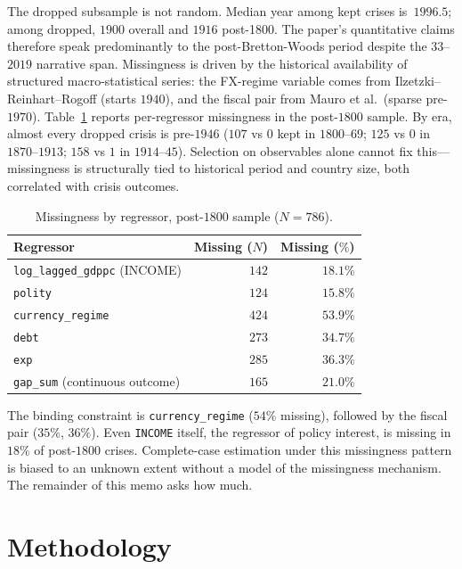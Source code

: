 \documentclass[11pt]{article}
\begin{document}
The dropped subsample is not random. Median year among kept crises
is~$1996.5$; among dropped, $1900$ overall and $1916$ post-1800. The
paper's quantitative claims therefore speak predominantly to the
post-Bretton-Woods period despite the $33$--$2019$ narrative span.
Missingness is driven by the historical availability of structured
macro-statistical series: the FX-regime variable comes from
Ilzetzki--Reinhart--Rogoff (starts $1940$), and the fiscal pair from
Mauro et al.\ (sparse pre-$1970$). Table~\ref{tab:miss} reports
per-regressor missingness in the post-$1800$ sample. By era, almost
every dropped crisis is pre-$1946$ ($107$ vs $0$ kept in $1800$--$69$;
$125$ vs $0$ in $1870$--$1913$; $158$ vs $1$ in $1914$--$45$).
Selection on observables alone cannot fix this---missingness is
structurally tied to historical period and country size, both
correlated with crisis outcomes.

\begin{table}[h]
\centering
\caption{Missingness by regressor, post-$1800$ sample ($N = 786$).}
\label{tab:miss}
\begin{tabular}{lrr}
\toprule
Regressor & Missing ($N$) & Missing ($\%$) \\
\midrule
\texttt{log\_lagged\_gdppc} (INCOME) & $142$ & $18.1\%$ \\
\texttt{polity}                       & $124$ & $15.8\%$ \\
\texttt{currency\_regime}             & $424$ & $53.9\%$ \\
\texttt{debt}                         & $273$ & $34.7\%$ \\
\texttt{exp}                          & $285$ & $36.3\%$ \\
\texttt{gap\_sum} (continuous outcome) & $165$ & $21.0\%$ \\
\bottomrule
\end{tabular}
\end{table}

The binding constraint is \texttt{currency\_regime} ($54\%$ missing),
followed by the fiscal pair ($35\%$, $36\%$). Even \texttt{INCOME}
itself, the regressor of policy interest, is missing in $18\%$ of
post-$1800$ crises. Complete-case estimation under this missingness
pattern is biased to an unknown extent without a model of the
missingness mechanism. The remainder of this memo asks how much.

\section{Methodology}\label{sec:methods}
\end{document}
